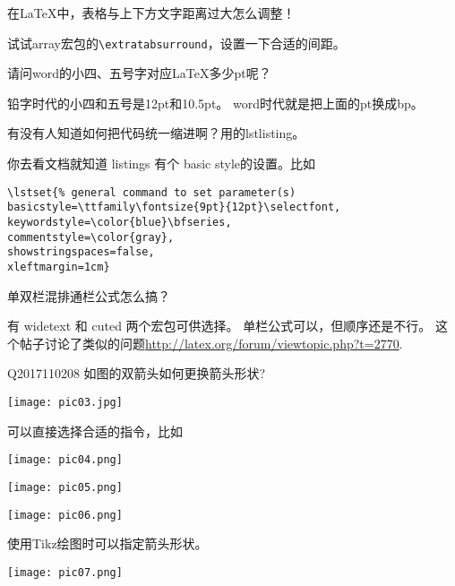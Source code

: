 \documentclass[QAofGroup.tex]{subfiles}
\begin{document}
\begin{qst}\label{Q2017110204}
在\LaTeX{}中，表格与上下方文字距离过大怎么调整！
\end{qst}
\ans 试试array宏包的\verb|\extratabsurround|，设置一下合适的间距。

\begin{qst}\label{Q2017110205}
请问word的小四、五号字对应LaTeX多少pt呢？
\end{qst}
\ans 铅字时代的小四和五号是12pt和10.5pt。
word时代就是把上面的pt换成bp。

\begin{qst}\label{Q2017110206}
有没有人知道如何把代码统一缩进啊？用的lstlisting。
\end{qst}
\ans 你去看文档就知道 listings 有个 basic style的设置。比如
\begin{verbatim}
\lstset{% general command to set parameter(s)
basicstyle=\ttfamily\fontsize{9pt}{12pt}\selectfont,
keywordstyle=\color{blue}\bfseries,
commentstyle=\color{gray},
showstringspaces=false,
xleftmargin=1cm}
\end{verbatim}

\begin{qst}\label{Q2017110207}
单双栏混排通栏公式怎么搞？
\end{qst}
\ans 有 widetext 和 cuted 两个宏包可供选择。
单栏公式可以，但顺序还是不行。
这个帖子讨论了类似的问题\url{http://latex.org/forum/viewtopic.php?t=2770}.

\begin{qst}{Q2017110208}
如图的双箭头如何更换箭头形状?

\texttt{[image: pic03.jpg]}
\end{qst}
\ans 可以直接选择合适的指令，比如

\texttt{[image: pic04.png]}

\texttt{[image: pic05.png]}

\texttt{[image: pic06.png]}

使用Tikz绘图时可以指定箭头形状。

\texttt{[image: pic07.png]}
\end{document}
